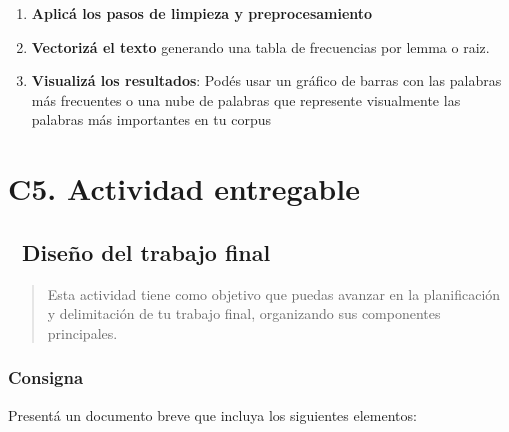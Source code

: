 \documentclass[
  letterpaper,
  DIV=11,
  numbers=noendperiod]{scrreprt}
\providecommand{\tightlist}{%
  \setlength{\itemsep}{0pt}\setlength{\parskip}{0pt}}\usepackage{longtable,booktabs,array}
\begin{document}
\begin{enumerate}
\def\labelenumi{\arabic{enumi}.}
\tightlist
\item
  \textbf{Aplicá los pasos de limpieza y preprocesamiento}
\item
  \textbf{Vectorizá el texto} generando una tabla de frecuencias por
  lemma o raiz.
\item
  \textbf{Visualizá los resultados}: Podés usar un gráfico de barras con
  las palabras más frecuentes o una nube de palabras que represente
  visualmente las palabras más importantes en tu corpus
\end{enumerate}

\chapter{C5. Actividad entregable}\label{c5.-actividad-entregable}

\section{📄 Diseño del trabajo final}\label{diseuxf1o-del-trabajo-final}

\begin{quote}
Esta actividad tiene como objetivo que puedas avanzar en la
planificación y delimitación de tu trabajo final, organizando sus
componentes principales.
\end{quote}

\subsection{Consigna}\label{consigna}

Presentá un documento breve que incluya los siguientes elementos:
\end{document}
